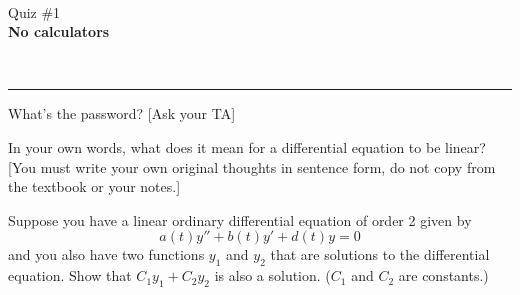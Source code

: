 \documentclass[12pt]{article}
\newcommand{\version}{}
\newcommand{\xzero}{}
\newcommand{\xone}{}
\newcommand{\xtwo}{}
\newcommand{\xthree}{}
\newcommand{\xfour}{}
\newcommand{\xfive}{}
\newcommand{\ExamName}{Quiz \#1\version}
\begin{document}
\renewcommand{\version}{}
\renewcommand{\xzero}{0.0}
\renewcommand{\xone}{1.3}
\renewcommand{\xtwo}{2.9}
\renewcommand{\xthree}{4.1}
\renewcommand{\xfour}{5.3}
\renewcommand{\xfive}{6.5}
% 
\begin{minipage}{0.25\linewidth}
  \CourseName\ \Quarter \\
  \ExamName \\[1em]
  \textbf{No calculators}\\[2em]
\end{minipage}
\hfill
\begin{minipage}[t]{0.4\linewidth}
\end{minipage}
\hfill
\begin{minipage}{0.25\linewidth}
  \vspace*{-3.25em}
  \ \hfill
\end{minipage}
\vspace*{-0.25in}

\hfill
\begin{minipage}{0.5\linewidth}

\end{minipage}
\noindent\hspace*{-2em}\rule{\textwidth+4em}{1pt}%

\begin{enumerate}
  \setcounter{problemnumber}{0}
	\Problem What's the password? [Ask your TA]
	\vspace*{36pt}

  \Problem In your own words, what does it mean for a differential equation to be linear? [You must write your own original thoughts in sentence form, do not copy from the textbook or your notes.]
  
  \vfill
  
  \Problem Suppose you have a linear ordinary differential equation of order 2 given by $$a(t)y''+b(t)y'+d(t)y=0$$ and you also have two functions $y_1$ and $y_2$ that are solutions to the differential equation. Show that $C_1y_1+C_2y_2$ is also a solution. ($C_1$ and $C_2$ are constants.) 
  
  \vfill
  \vfill


\end{enumerate}
\end{document}
